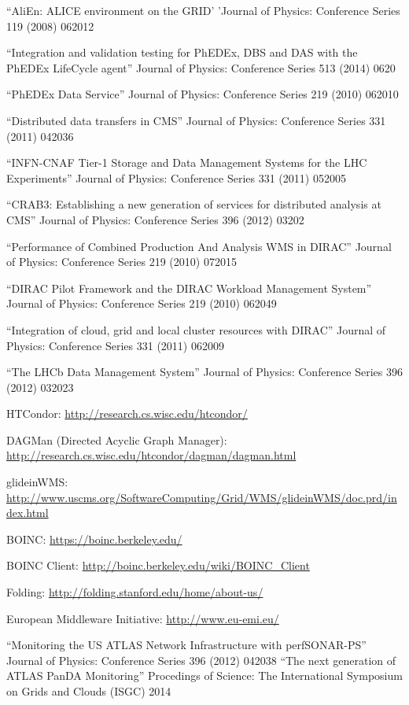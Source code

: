 \begin{thebibliography}{99}
 ``AliEn: ALICE environment on the GRID' 'Journal of Physics: Conference Series 119 (2008) 062012

 ``Integration and validation testing for PhEDEx, DBS and DAS with the PhEDEx LifeCycle agent'' Journal of Physics: Conference Series 513 (2014) 0620

 ``PhEDEx Data Service'' Journal of Physics: Conference Series 219 (2010) 062010

 ``Distributed data transfers in CMS'' Journal of Physics: Conference Series 331 (2011) 042036

 ``INFN-CNAF Tier-1 Storage and Data Management Systems for the LHC Experiments'' Journal of Physics: Conference Series 331 (2011) 052005

 ``CRAB3: Establishing a new generation of services for distributed analysis at CMS'' Journal of Physics: Conference Series 396 (2012) 03202

 ``Performance of Combined Production And Analysis WMS in DIRAC'' Journal of Physics: Conference Series 219 (2010) 072015

 ``DIRAC Pilot Framework and the DIRAC Workload Management System'' Journal of Physics: Conference Series 219 (2010) 062049

 ``Integration of cloud, grid and local cluster resources with DIRAC'' Journal of Physics: Conference Series 331 (2011) 062009

 ``The LHCb Data Management System'' Journal of Physics: Conference Series 396 (2012) 032023

 HTCondor: \url{http://research.cs.wisc.edu/htcondor/}

 DAGMan (Directed Acyclic Graph Manager): \url{http://research.cs.wisc.edu/htcondor/dagman/dagman.html}

 glideinWMS: \url{http://www.uscms.org/SoftwareComputing/Grid/WMS/glideinWMS/doc.prd/index.html}

 BOINC: \url{https://boinc.berkeley.edu/}

 BOINC Client: \url{http://boinc.berkeley.edu/wiki/BOINC_Client}

 Folding: \url{http://folding.stanford.edu/home/about-us/}

 European Middleware Initiative: \url{http://www.eu-emi.eu/}

 ``Monitoring the US ATLAS Network Infrastructure with perfSONAR-PS'' Journal of Physics: Conference Series 396 (2012) 042038
 ``The next generation of ATLAS PanDA Monitoring'' Procedings of Science: The International Symposium on Grids and Clouds (ISGC) 2014
\end{thebibliography}
